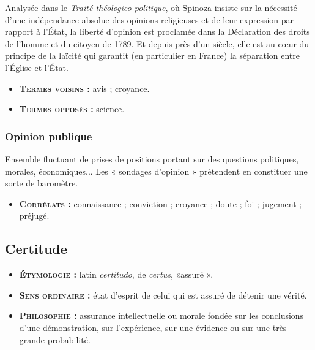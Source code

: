 Analysée dans le {\it Traité
théologico-politique}, où Spinoza insiste
sur la nécessité d'une indépendance
absolue des opinions religieuses et de
leur expression par rapport à l'État, la
liberté d'opinion est proclamée dans la
Déclaration des droits de l'homme et du
citoyen de 1789. Et depuis près d'un
siècle, elle est au cœur du principe de la
laïcité qui garantit (en particulier en
France) la séparation entre l'Église et
l'État.

{\footnotesize
\begin{itemize}[leftmargin=1cm, label=, itemsep=1pt]
\item {\bf \textsc{Termes voisins} :} avis ; croyance.
\item {\bf \textsc{Termes opposés} :} science.
\end{itemize}
}

\subsubsection{Opinion publique}

Ensemble fluctuant de prises de positions
portant sur des questions politiques,
 morales, économiques... Les
« sondages d'opinion » prétendent en
constituer une sorte de baromètre.

{\footnotesize
\begin{itemize}[leftmargin=1cm, label=, itemsep=1pt]
\item {\bf \textsc{Corrélats} :} connaissance ;
conviction ; croyance ; doute ; foi ;
jugement ; préjugé.
\end{itemize}
}


\subsection{Certitude}

{\footnotesize
\begin{itemize}[leftmargin=1cm, label=, itemsep=1pt]
\item {\bf \textsc{Étymologie} :} latin {\it certitudo},
de {\it certus}, «assuré ».
\item {\bf \textsc{Sens ordinaire} :} état d'esprit
de celui qui est assuré de détenir une vérité.
\item {\bf \textsc{Philosophie} :} assurance intellectuelle
ou morale fondée sur les
conclusions d’une démonstration,
sur l'expérience, sur une évidence
ou sur une très grande probabilité.
\end{itemize}
}


